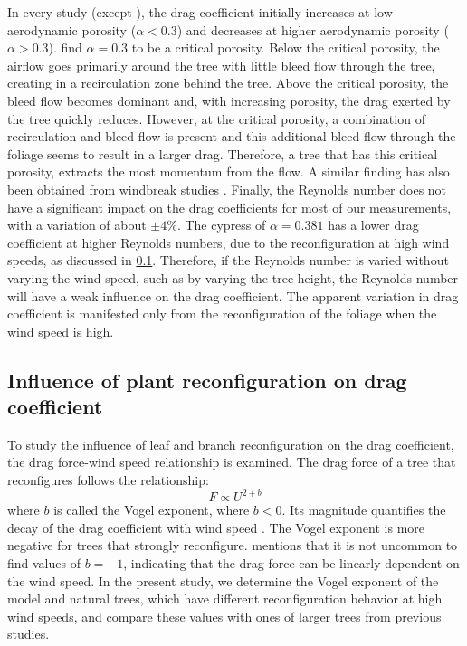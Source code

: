 In every study (except \cite{Hagen1971}), the drag coefficient initially increases at low aerodynamic porosity ($\alpha < 0.3$) and decreases at higher aerodynamic porosity ($\alpha > 0.3$). \cite{Dong2007} find $\alpha = 0.3$ to be a critical porosity. Below the critical porosity, the airflow goes primarily around the tree with little bleed flow through the tree, creating in a recirculation zone behind the tree. Above the critical porosity, the bleed flow becomes dominant and, with increasing porosity, the drag exerted by the tree quickly reduces. However, at the critical porosity, a combination of recirculation and bleed flow is present and this additional bleed flow through the foliage seems to result in a larger drag. Therefore, a tree that has this critical porosity, extracts the most momentum from the flow. A similar finding has also been obtained from windbreak studies \citep{Dong2008,Hagen1971,Lee1999}. Finally, the Reynolds number does not have a significant impact on the drag coefficients for most of our measurements, with a variation of about $\pm 4$\%. The cypress of $\alpha=0.381$ has a lower drag coefficient at higher Reynolds numbers, due to the reconfiguration at high wind speeds, as discussed in \cref{subsec:reconfiguration}. Therefore, if the Reynolds number is varied without varying the wind speed, such as by varying the tree height, the Reynolds number will have a weak influence on the drag coefficient. The apparent variation in drag coefficient is manifested only from the reconfiguration of the foliage when the wind speed is high.

\subsection{Influence of plant reconfiguration on drag coefficient}
\label{subsec:reconfiguration}

To study the influence of leaf and branch reconfiguration on the drag coefficient, the drag force-wind speed relationship is examined. The drag force of a tree that reconfigures follows the relationship:
\begin{equation}
F \propto U^{2+b}
\label{eq:vogelrelation}
\end{equation}
where $b$ is called the Vogel exponent, where $b<0$. Its magnitude quantifies the decay of the drag coefficient with wind speed \citep{DeLangre2008,Vogel1989}. The Vogel exponent is more negative for trees that strongly reconfigure. \cite{DeLangre2008} mentions that it is not uncommon to find values of $b=-1$, indicating that the drag force can be linearly dependent on the wind speed. In the present study, we determine the Vogel exponent of the model and natural trees, which have different reconfiguration behavior at high wind speeds, and compare these values with ones of larger trees from previous studies. 

